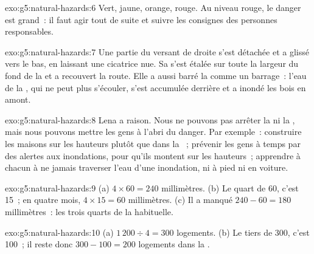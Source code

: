\begin{solution}{exo:g5:natural-hazards:6}
Vert, jaune, orange, rouge. Au niveau rouge, le danger est grand~: il faut
agir tout de suite et suivre les consignes des personnes responsables.
\end{solution}

\begin{solution}{exo:g5:natural-hazards:7}
Une partie du versant de droite s'est détachée et a glissé vers le bas, en
laissant une cicatrice nue. Sa  s'est étalée sur toute la largeur du
fond de la  et a recouvert la route. Elle a aussi barré la 
comme un barrage~: l'eau de la , qui ne peut plus s'écouler, s'est
accumulée derrière et a inondé les bois en amont.
\end{solution}

\begin{solution}{exo:g5:natural-hazards:8}
Lena a raison. Nous ne pouvons pas arrêter la  ni la , mais
nous pouvons mettre les gens à l'abri du danger. Par exemple~: construire
les maisons sur les hauteurs plutôt que dans la ~;
prévenir les gens à temps par des alertes aux inondations, pour qu'ils
montent sur les hauteurs~; apprendre à chacun à ne jamais traverser l'eau
d'une inondation, ni à pied ni en voiture.
\end{solution}

\begin{solution}{exo:g5:natural-hazards:9}
(a) $4 \times 60 = 240$ millimètres. (b) Le quart de 60, c'est 15~; en
quatre mois, $4 \times 15 = 60$ millimètres. (c) Il a manqué
$240 - 60 = 180$ millimètres~: les trois quarts de la  habituelle.
\end{solution}

\begin{solution}{exo:g5:natural-hazards:10}
(a) $1\,200 \div 4 = 300$ logements. (b) Le tiers de 300, c'est 100~; il
reste donc $300 - 100 = 200$ logements dans la .
\end{solution}

